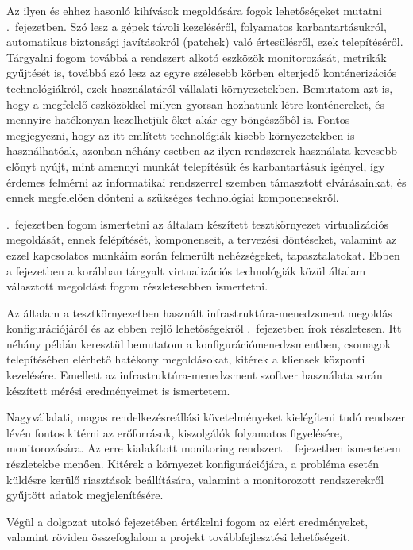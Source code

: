 Az ilyen és ehhez hasonló kihívások megoldására fogok lehetőségeket mutatni .~fejezetben. Szó lesz a gépek távoli kezeléséről, folyamatos karbantartásukról, automatikus biztonsági javításokról (patchek) való értesülésről, ezek telepítéséről. Tárgyalni fogom továbbá a rendszert alkotó eszközök monitorozását, metrikák gyűjtését is, továbbá szó lesz az egyre szélesebb körben elterjedő konténerizációs technológiákról, ezek használatáról vállalati környezetekben. Bemutatom azt is, hogy a megfelelő eszközökkel milyen gyorsan hozhatunk létre konténereket, és mennyire hatékonyan kezelhetjük őket akár egy böngészőből is.
Fontos megjegyezni, hogy az itt említett technológiák kisebb környezetekben is használhatóak, azonban néhány esetben az ilyen rendszerek használata kevesebb előnyt nyújt, mint amennyi munkát telepítésük és karbantartásuk igényel, így érdemes felmérni az informatikai rendszerrel szemben támasztott elvárásainkat, és ennek megfelelően dönteni a szükséges technológiai komponensekről.

.~fejezetben fogom ismertetni az általam készített tesztkörnyezet virtualizációs megoldását, ennek felépítését, komponenseit, a tervezési döntéseket, valamint az ezzel kapcsolatos munkáim során felmerült nehézségeket, tapasztalatokat. Ebben a fejezetben a korábban tárgyalt virtualizációs technológiák közül általam választott megoldást fogom részletesebben ismertetni.

Az általam a tesztkörnyezetben használt infrastruktúra-menedzsment megoldás konfigurációjáról és az ebben rejlő lehetőségekről .~fejezetben írok részletesen. Itt néhány példán keresztül bemutatom a konfigurációmenedzsmentben, csomagok telepítésében elérhető hatékony megoldásokat, kitérek a kliensek központi kezelésére. Emellett az infrastruktúra-menedzsment szoftver használata során készített mérési eredményeimet is ismertetem.

Nagyvállalati, magas rendelkezésreállási követelményeket kielégíteni tudó rendszer lévén fontos kitérni az erőforrások, kiszolgálók folyamatos figyelésére, monitorozására. Az erre kialakított monitoring rendszert .~fejezetben ismertetem részletekbe menően. Kitérek a környezet konfigurációjára, a probléma esetén küldésre kerülő riasztások beállítására, valamint a monitorozott rendszerekről gyűjtött adatok megjelenítésére.

Végül a dolgozat utolsó fejezetében értékelni fogom az elért eredményeket, valamint röviden összefoglalom a projekt továbbfejlesztési lehetőségeit.


